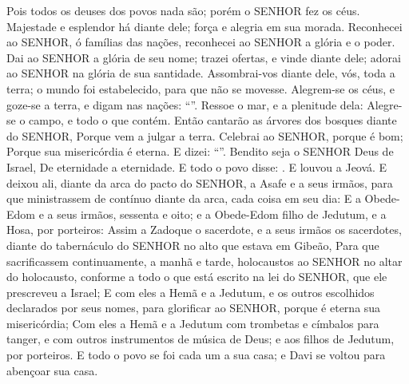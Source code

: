 {{  Pois todos os deuses dos povos nada são; porém o SENHOR fez os céus.
  Majestade e esplendor há diante dele; força e alegria em sua morada. %
  Reconhecei ao SENHOR, ó famílias das nações, reconhecei ao SENHOR a glória e o poder.
  Dai ao SENHOR a glória de seu nome; trazei ofertas, e vinde diante dele; adorai ao SENHOR na glória de sua santidade.
  Assombrai-vos diante dele, vós, toda a terra; o mundo {} foi estabelecido, para que não se movesse.
  Alegrem-se os céus, e goze-se a terra, e digam nas nações: \enquote{}.
  Ressoe o mar, e a plenitude dela: Alegre-se o campo, e todo o que contém.
  Então cantarão as árvores dos bosques diante do SENHOR, Porque vem a julgar a terra.
  Celebrai ao SENHOR, porque é bom; Porque sua misericórdia é eterna.
  E dizei: \enquote{}.
  Bendito seja o SENHOR Deus de Israel, De eternidade a eternidade}. E todo o povo disse: . E louvou a Jeová.
  E deixou ali, diante da arca do pacto do SENHOR, a Asafe e a seus irmãos, para que ministrassem de contínuo diante da arca, cada coisa em seu dia: %
  E a Obede-Edom e a seus irmãos, sessenta e oito; e a Obede-Edom filho de Jedutum, e a Hosa, por porteiros:
  Assim a Zadoque o sacerdote, e a seus irmãos os sacerdotes, diante do tabernáculo do SENHOR no alto que estava em Gibeão,
  Para que sacrificassem continuamente, a manhã e tarde, holocaustos ao SENHOR no altar do holocausto, conforme a todo o que está escrito na lei do SENHOR, que ele prescreveu a Israel;
  E com eles a Hemã e a Jedutum, e os outros escolhidos declarados por seus nomes, para glorificar ao SENHOR, porque é eterna sua misericórdia;
  Com eles a Hemã e a Jedutum com trombetas e címbalos para tanger, e com outros instrumentos de música de Deus; e aos filhos de Jedutum, por porteiros.
  E todo o povo se foi cada um a sua casa; e Davi se voltou para abençoar sua casa.
\par }

